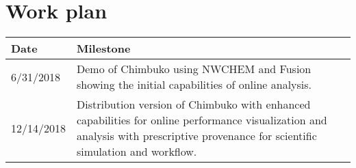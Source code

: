 \section{Work plan}

\begin{tabular}{|p{0.7in}|p{5.5in}|}\hline
\textbf{Date}  & \textbf{Milestone} \\\hline
6/31/2018 &  Demo of Chimbuko using NWCHEM and Fusion showing the initial capabilities of online analysis.\\\hline
12/14/2018 & Distribution version of Chimbuko with enhanced capabilities for online performance visualization and analysis with prescriptive provenance for scientific simulation and workflow. \\\hline

\end{tabular}
